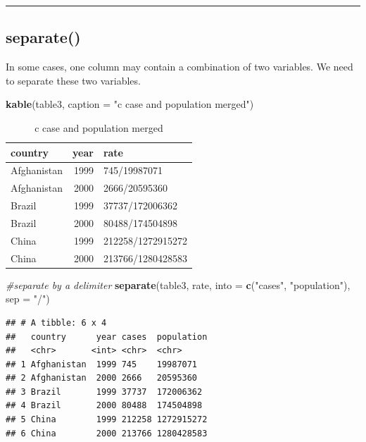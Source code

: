 \documentclass[]{book}
\newenvironment{Shaded}{\begin{snugshade}}{\end{snugshade}}
\newcommand{\KeywordTok}[1]{\textcolor[rgb]{0.13,0.29,0.53}{\textbf{#1}}}
\newcommand{\DataTypeTok}[1]{\textcolor[rgb]{0.13,0.29,0.53}{#1}}
\newcommand{\StringTok}[1]{\textcolor[rgb]{0.31,0.60,0.02}{#1}}
\newcommand{\CommentTok}[1]{\textcolor[rgb]{0.56,0.35,0.01}{\textit{#1}}}
\newcommand{\NormalTok}[1]{#1}
\begin{document}
\begin{center}\rule{0.5\linewidth}{\linethickness}\end{center}

\subsection{separate()}\label{separate}

In some cases, one column may contain a combination of two variables. We
need to separate these two variables.

\begin{Shaded}
\begin{Highlighting}[]
\KeywordTok{kable}\NormalTok{(table3, }\DataTypeTok{caption =} \StringTok{"c case and population merged"}\NormalTok{)}
\end{Highlighting}
\end{Shaded}

\begin{table}[t]

\caption{\label{tab:unnamed-chunk-16}c case and population merged}
\centering
\begin{tabular}{l|r|l}
\hline
country & year & rate\\
\hline
Afghanistan & 1999 & 745/19987071\\
\hline
Afghanistan & 2000 & 2666/20595360\\
\hline
Brazil & 1999 & 37737/172006362\\
\hline
Brazil & 2000 & 80488/174504898\\
\hline
China & 1999 & 212258/1272915272\\
\hline
China & 2000 & 213766/1280428583\\
\hline
\end{tabular}
\end{table}

\begin{Shaded}
\begin{Highlighting}[]
\CommentTok{#separate by a delimiter}
\KeywordTok{separate}\NormalTok{(table3, rate, }\DataTypeTok{into =} \KeywordTok{c}\NormalTok{(}\StringTok{"cases"}\NormalTok{, }\StringTok{"population"}\NormalTok{), }\DataTypeTok{sep =} \StringTok{"/"}\NormalTok{)}
\end{Highlighting}
\end{Shaded}

\begin{verbatim}
## # A tibble: 6 x 4
##   country      year cases  population
##   <chr>       <int> <chr>  <chr>     
## 1 Afghanistan  1999 745    19987071  
## 2 Afghanistan  2000 2666   20595360  
## 3 Brazil       1999 37737  172006362 
## 4 Brazil       2000 80488  174504898 
## 5 China        1999 212258 1272915272
## 6 China        2000 213766 1280428583
\end{verbatim}
\end{document}
